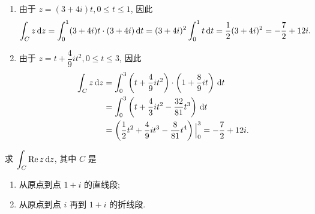 \begin{solution}
	\begin{enumerate}
		\item 由于 $z=(3+4i)t,0\le t\le 1$, 因此
		\[
			\int_Cz\,\mathrm{d} z=\int_0^1(3+4i)t\cdot(3+4i)\,\mathrm{d} t
			=(3+4i)^2\int_0^1t\,\mathrm{d} t
			=\frac{1}{2} (3+4i)^2=-\frac72+12i.
		\]
		\item 由于 $z=t+\dfrac49it^2,0\le t\le 3$, 因此
		\begin{align*}
			\int_Cz\,\mathrm{d} z&=\int_0^3\left(t+\frac{4}9it^2\right)\cdot\left(1+\frac89it\right)\,\mathrm{d} t\\
			&=\int_0^3\left(t+\frac43it^2-\frac{32}{81}t^3\right)\,\mathrm{d} t\\
			&=\left(\frac{1}{2} t^2+\frac49it^3-\frac8{81}t^4\right)\Big|_0^3
			=-\frac72+12i.
		\end{align*}
	\end{enumerate}
\end{solution}

\begin{example}
	求 $\displaystyle\int_C\operatorname{Re} z\,\mathrm{d} z$, 其中 $C$ 是
	\begin{enumerate}
		\item 从原点到点 $1+i$ 的直线段;
		\item 从原点到点 $i$ 再到 $1+i$ 的折线段.
	\end{enumerate}
\end{example}

\begin{figure}[hbpt]
	\centering
	\begin{minipage}{.48\textwidth}
		\centering
		\end{minipage}
		\begin{minipage}{.48\textwidth}
			\centering
	\end{minipage}
\end{figure}

